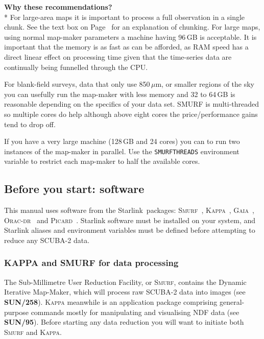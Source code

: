 \documentclass[twoside,11pt]{article}
\newcommand{\htmladdnormallink}[2]{#1}
\newcommand{\htmlref}[2]{#1}
\newcommand{\latexhtml}[2]{#1}
\newcommand{\xref}[3]{#1}
\newcommand{\xlabel}[1]{}
\renewcommand{\_}{\texttt{\symbol{95}}}
\newcommand{\starlink}{\htmladdnormallink{Starlink}{http://starlink.jach.hawaii.edu}}
\newcommand{\gaia}{\xref{\textsc{Gaia}}{sun214}{}}
\newcommand{\Kappa}{\xref{\textsc{Kappa}}{sun95}{}}
\newcommand{\oracdr}{\htmladdnormallink{\textsc{Orac-dr}}{http://www.oracdr.org/oracdr}}
\newcommand{\picard}{\xref{\textsc{Picard}}{sun265}{}}
\newcommand{\smurf}{\xref{\textsc{Smurf}}{sun258}{}}
\newcommand{\envvar}[1]{\texttt{#1}}
\newcommand{\kappasun}{\xref{\textbf{SUN/95}}{sun95}{}}
\newcommand{\smurfsun}{\xref{\textbf{SUN/258}}{sun258}{}}
\begin{document}
\textbf{Why these recommendations?}\\*
For large-area maps it is important to process a full observation in a
single chunk. See the text box on
\latexhtml{Page~\pageref{page:text}}{\htmlref{What to look
for}{box:chunk}} for an explanation of chunking. For large maps, using normal
map-maker parameters a machine having 96\,GB is acceptable. It is
important that the memory is as fast as can be afforded, as RAM speed
has a direct linear effect on processing time given that the
time-series data are continually being funnelled through the CPU.

For blank-field surveys, data that only use 850\,$\mu$m, or smaller
regions of the sky you can usefully run the map-maker with less memory
and 32 to 64\,GB is reasonable depending on the specifics of your data
set. SMURF is multi-threaded so multiple cores do help although above
eight cores the price/performance gains tend to drop off.

If you have a very large machine (128\,GB and 24 cores) you can to run
two instances of the map-maker in parallel. Use the \envvar{SMURF\_THREADS}
environment variable to restrict each map-maker to half the available
cores.


\subsection{\xlabel{software}Before you start: software}

This manual uses software from the \starlink\ packages: \smurf\
\cite{smurf}, \Kappa\ \cite{kappa}, \gaia\ \cite{gaia}, \oracdr\
\cite{oracdr} and \picard\ \cite{picard}. Starlink software must be
installed on your system, and Starlink aliases and environment
variables must be defined before attempting to reduce any SCUBA-2
data.


\subsubsection{KAPPA and SMURF for data processing}

The Sub-Millimetre User Reduction Facility, or \textsc{Smurf},
contains the Dynamic Iterative Map-Maker, which will process raw
SCUBA-2 data into images (see \smurfsun). \textsc{Kappa} meanwhile is
an application package comprising general-purpose commands mostly for
manipulating and visualising NDF data (see \kappasun). Before starting
any data reduction you will want to initiate both \textsc{Smurf} and
\textsc{Kappa}.
\end{document}
